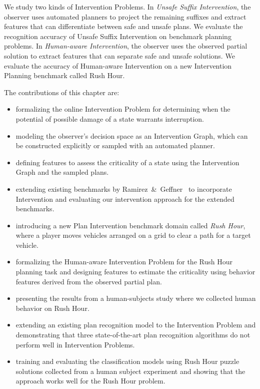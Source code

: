 We study two kinds of Intervention Problems. 
In \emph{Unsafe Suffix Intervention}, the observer uses automated planners to project the remaining suffixes and extract features that can differentiate between safe and unsafe plans. 
We evaluate the recognition accuracy of Unsafe Suffix Intervention on benchmark planning problems. 
In \emph{Human-aware Intervention}, the observer uses the observed partial solution to extract features that can separate safe and unsafe solutions. 
We evaluate the accuracy of Human-aware Intervention on a new Intervention Planning benchmark called Rush Hour.


The contributions of this chapter are:
\begin{itemize}
\item formalizing the online Intervention Problem for determining when the potential of possible damage  of a state warrants interruption.
\item modeling the observer's decision space as an Intervention Graph, which can be constructed explicitly or sampled with an automated planner.
\item defining features to assess the criticality of a state using the Intervention Graph and the sampled plans.
\item extending existing benchmarks by Ramirez~\&~Geffner~ \citeyear{ramirez2009plan, ramirez2010probabilistic} to incorporate Intervention and  evaluating our intervention approach for the extended benchmarks.
\item introducing a new Plan Intervention benchmark domain called \emph{Rush Hour}, where a player moves vehicles arranged on a grid to clear a path for a target vehicle. 
\item formalizing the Human-aware Intervention Problem for the Rush Hour planning task and designing features to estimate the criticality using behavior features derived from the observed partial plan.
\item presenting the results from a human-subjects study where we collected human behavior on Rush Hour.
\item extending an existing plan recognition model to the Intervention Problem and demonstrating that three state-of-the-art plan recognition algorithms do not perform well in Intervention Problems.
\item training and evaluating the classification models using Rush Hour puzzle solutions collected from a human subject experiment and showing that the approach works well for the Rush Hour problem.
\end{itemize}

